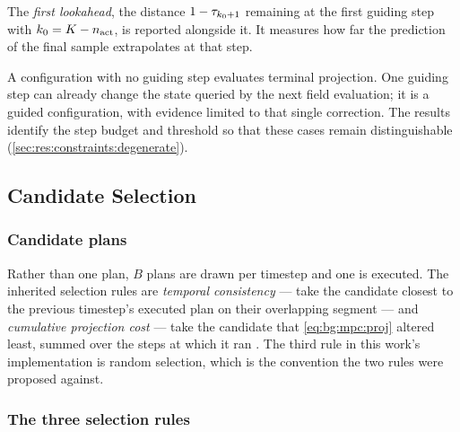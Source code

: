 The \emph{first lookahead}, the distance $1-\tau_{k_{0}+1}$ remaining at the first guiding step with
$k_{0} = K - n_{\textrm{act}}$, is reported alongside it. It measures how far the prediction of the final
sample extrapolates at that step.

A configuration with no guiding step evaluates terminal projection. One guiding step can already
change the state queried by the next field evaluation; it is a guided configuration, with evidence
limited to that single correction. The results identify the step budget and threshold so that these
cases remain distinguishable (\autoref{sec:res:constraints:degenerate}).

\subsection{Candidate Selection}\label{sec:method:selection}

\subsubsection*{Candidate plans}

Rather than one plan, $B$ plans are drawn per timestep and one is executed. The inherited
selection rules are \emph{temporal consistency} --- take the candidate closest to the previous
timestep's executed plan on their overlapping segment --- and \emph{cumulative projection
cost} --- take the candidate that \eqref{eq:bg:mpc:proj} altered least, summed over the steps
at which it ran \parencite[Sec.~5.4]{romer2025diffusion}. The third rule in this work's implementation is random selection,
which is the convention the two rules were proposed against.

\subsubsection*{The three selection rules}

